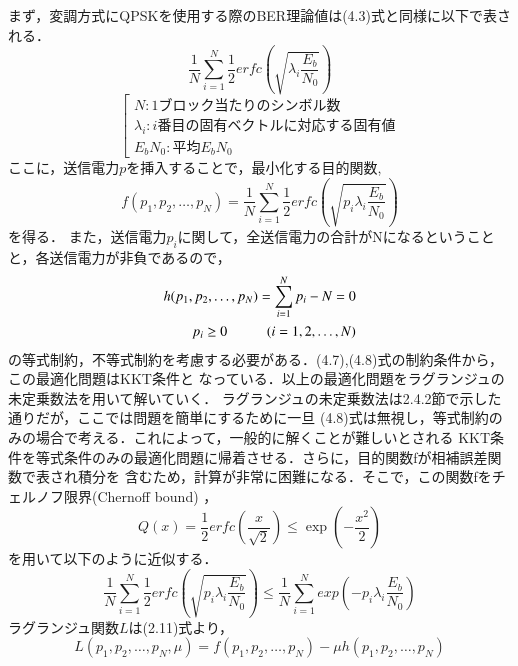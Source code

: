 まず，変調方式にQPSKを使用する際のBER理論値は(4.3)式と同様に以下で表される．
\begin{equation}
    \frac{1}{N} \sum_{i=1}^N \frac{1}{2}erfc\left( \sqrt{\lambda_i\frac{E_b}{N_0}} \right)
\end{equation}
\begin{equation}
    \left[
        \begin{array}{l}
            N:1ブロック当たりのシンボル数 \\
            \lambda_i:i番目の固有ベクトルに対応する固有値 \\
            E_bN_0:平均E_bN_0
        \end{array}
    \right. \nonumber
\end{equation}
ここに，送信電力$p$を挿入することで，最小化する目的関数,
\begin{equation}
    f(p_1,p_2,\ldots,p_N) = \frac{1}{N} \sum_{i=1}^N \frac{1}{2}erfc\left( \sqrt{p_i\lambda_i\frac{E_b}{N_0}} \right)
\end{equation}
を得る．
また，送信電力$p_i$に関して，全送信電力の合計がNになるということと，各送信電力が非負であるので，
\begin{eqnarray}
    h(p_1,p_2,\ldots,p_N) = \sum_{i=1}^N p_i-N=0 \\
    p_i \geq 0 \hspace{10mm} (i=1,2,\ldots,N)
\end{eqnarray}
の等式制約，不等式制約を考慮する必要がある．(4.7),(4.8)式の制約条件から，この最適化問題はKKT条件と
なっている．以上の最適化問題をラグランジュの未定乗数法を用いて解いていく．
ラグランジュの未定乗数法は2.4.2節で示した通りだが，ここでは問題を簡単にするために一旦
(4.8)式は無視し，等式制約のみの場合で考える．これによって，一般的に解くことが難しいとされる
KKT条件を等式条件のみの最適化問題に帰着させる．さらに，目的関数fが相補誤差関数で表され積分を
含むため，計算が非常に困難になる．そこで，この関数fをチェルノフ限界(Chernoff bound) \cite{akaiwa}，
\begin{equation}
    Q(x) = \frac{1}{2}erfc\left( \frac{x}{\sqrt{2}} \right) \leq \exp\left( -\frac{x^2}{2} \right)
\end{equation}
を用いて以下のように近似する．
\begin{equation}
    \frac{1}{N}\sum_{i=1}^N \frac{1}{2}erfc\left( \sqrt{p_i\lambda_i\frac{E_b}{N_0}} \right)
    \leq \frac{1}{N}\sum_{i=1}^N exp \left( -p_i\lambda_i\frac{E_b}{N_0} \right)
\end{equation}
ラグランジュ関数$L$は(2.11)式より，
\begin{equation}
    L(p_1,p_2,\ldots,p_N,\mu) = f(p_1,p_2,\ldots,p_N)-\mu h(p_1,p_2,\ldots,p_N)
\end{equation}

